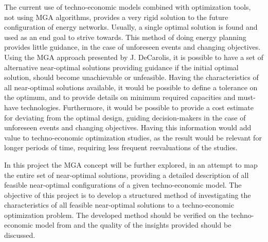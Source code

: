 The current use of techno-economic models combined with optimization tools, not using MGA algorithms, provides a very rigid solution to the future configuration of energy networks. Usually, a single optimal solution is found and used as an end goal to strive towards. This method of doing energy planning provides little guidance, in the case of unforeseen events and changing objectives. Using the MGA approach presented by J. DeCarolis, it is possible to have a set of alternative near-optimal solutions providing guidance if the initial optimal solution, should become unachievable or unfeasible. Having the characteristics of all near-optimal solutions available, it would be possible to define a tolerance on the optimum, and to provide details on minimum required capacities and must-have technologies. Furthermore, it would be possible to provide a cost estimate for deviating from the optimal design, guiding decision-makers in the case of unforeseen events and changing objectives. Having this information would add value to techno-economic optimization studies, as the result would be relevant for longer periods of time, requiring less frequent reevaluations of the studies. 


In this project the MGA concept will be further explored, in an attempt to map the entire set of near-optimal solutions, providing a detailed description of all feasible near-optimal configurations of a given techno-economic model. The objective of this project is to develop a structured method of investigating the characteristics of all feasible near-optimal solutions to a techno-economic optimization problem. The developed method should be verified on the techno-economic model from \cite{PyPSA_euro_30_model} and the quality of the insights provided should be discussed. 



